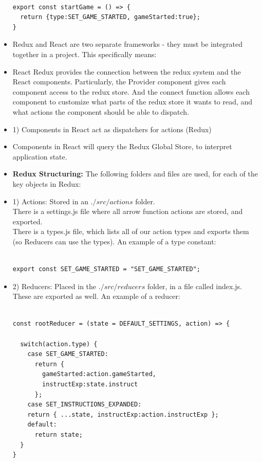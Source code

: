 \documentclass[8pt,a4paper]{extarticle}
\begin{document}
\begin{itemize}
\begin{verbatim}

export const startGame = () => {
  return {type:SET_GAME_STARTED, gameStarted:true};
}

\end{verbatim}

\item Redux and React are two separate frameworks - they must be integrated together in a project. This specifically means: 
\item React Redux provides the connection between the redux system and the React components. Particularly, the Provider component gives each component access to the redux store. And the connect function allows each component to customize what parts of the redux store it wants to read, and what actions the component should be able to dispatch.
\item 1) Components in React act as dispatchers for actions (Redux)
\item Components in React will query the Redux Global Store, to interpret application state.
\item \textbf{Redux Structuring:} The following folders and files are used, for each of the key objects in Redux:
\item 1) Actions: Stored in an $./src/actions$ folder. \\

There is a settings.js file where all arrow function actions are stored, and exported.\\

There is a types.js file, which lists all of our action types and exports them (so Reducers can use the types). An example of a type constant:

\begin{verbatim}

export const SET_GAME_STARTED = "SET_GAME_STARTED";

\end{verbatim}

\item 2) Reducers: Placed in the $./src/reducers$ folder, in a file called index.js. These are exported as well. An example of a reducer:

\begin{verbatim}

const rootReducer = (state = DEFAULT_SETTINGS, action) => {
 
  switch(action.type) { 
    case SET_GAME_STARTED:
      return {
        gameStarted:action.gameStarted,
        instructExp:state.instruct
      }; 
    case SET_INSTRUCTIONS_EXPANDED:       
    return { ...state, instructExp:action.instructExp };
    default:
      return state;
  }
}


\end{verbatim}
\end{itemize}
\end{document}
